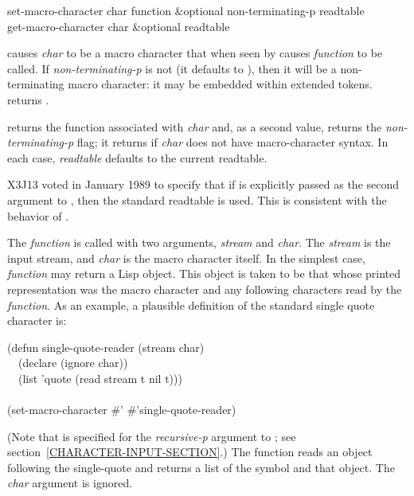 \begin{defun}[Function]
set-macro-character char function &optional non-terminating-p readtable \\
get-macro-character char &optional readtable

 causes \emph{char} to be a macro character that
when seen by  causes \emph{function} to be called.
If \emph{non-terminating-p} is not {\false} (it defaults to {\false}),
then it will be a non-terminating macro character: it may be embedded
within extended tokens.
 returns {\true}.

 returns the function associated with \emph{char}
and, as a second value, returns the \emph{non-terminating-p} flag; it returns
{\false} if \emph{char} does not have macro-character syntax.  In each case,
\emph{readtable} defaults to the current readtable.

\begin{new}
X3J13 voted in January 1989
to specify that if  is explicitly passed as the
second argument to , then the standard readtable is used.
This is consistent with the behavior of .
\end{new}

The \emph{function} is called with two arguments, \emph{stream}
and \emph{char}.  The \emph{stream} is the input stream, and \emph{char} is the
macro character itself.
In the simplest case, \emph{function} may return a Lisp object.
This object is taken to be that whose printed representation
was the macro character and any following characters read
by the \emph{function}.
As an example, a plausible definition of the standard single quote
character is:
\begin{lisp}
(defun single-quote-reader (stream char) \\
~~(declare (ignore char)) \\
~~(list 'quote (read stream t nil t))) \\
 \\
(set-macro-character \#{\Xbackslash}' \#'single-quote-reader)
\end{lisp}
(Note that {\true} is specified for the \emph{recursive-p} argument
to ; see section~\ref{CHARACTER-INPUT-SECTION}.)
The function reads an object following the single-quote and returns
a list of the symbol  and that object.
The \emph{char} argument is ignored.


\end{defun}
